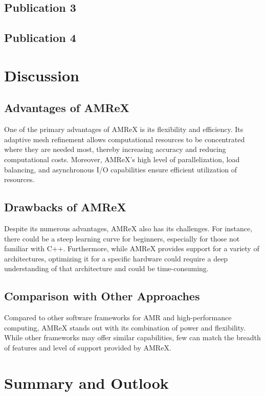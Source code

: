 \documentclass[12pt, a4paper]{scrartcl}
\begin{document}
\subsection{Publication 3}
\subsection{Publication 4}

\section{Discussion}
\subsection{Advantages of AMReX}

One of the primary advantages of AMReX is its flexibility and efficiency. Its adaptive mesh 
refinement allows computational resources to be concentrated where they are needed most, thereby 
increasing accuracy and reducing computational costs. Moreover, AMReX's high level of 
parallelization, load balancing, and asynchronous I/O capabilities ensure efficient 
utilization of resources.

\subsection{Drawbacks of AMReX}

Despite its numerous advantages, AMReX also has its challenges. For instance, there 
could be a steep learning curve for beginners, especially for those not familiar 
with C++. Furthermore, while AMReX provides support for a variety of architectures, optimizing 
it for a specific hardware could require a deep understanding of that architecture and 
could be time-consuming.

\subsection{Comparison with Other Approaches}

Compared to other software frameworks for AMR and high-performance computing, AMReX 
stands out with its combination of power and flexibility. While other frameworks 
may offer similar capabilities, few can match the breadth of features and level 
of support provided by AMReX.

\section{Summary and Outlook}
\end{document}

